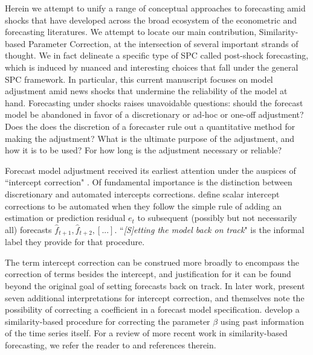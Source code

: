 \documentclass{uiucthesis2021}
\theoremstyle{definition}
\begin{document}
Herein we attempt to unify a range of conceptual approaches to forecasting amid shocks that have developed across the broad ecosystem of the econometric and forecasting literatures.  We attempt to locate our main contribution, Similarity-based Parameter Correction, at the intersection of several important strands of thought.  We in fact delineate a specific type of SPC called post-shock forecasting, which is induced by nuanced and interesting choices that fall under the general SPC framework.  In particular, this current manuscript focuses on model adjustment amid news shocks that undermine the reliability of the  model at hand.  Forecasting under shocks raises unavoidable questions: should the forecast model be abandoned in favor of a discretionary or ad-hoc or one-off adjustment?  Does the does the discretion of a forecaster rule out a quantitative method for making the adjustment?  What is the ultimate purpose of the adjustment, and how it is to be used?  For how long is the adjustment necessary or reliable?

Forecast model adjustment received its earliest attention under the auspices of ``intercept correction" \citep{hendry1994theory,clements1996intercept,clements1998forecasting, clements1999forecasting}.  Of fundamental importance is the distinction between discretionary and automated intercepts corrections. \cite{hendry1994theory} define scalar intercept corrections to be automated when they follow the simple rule of adding an estimation or prediction residual $e_{t}$ to subsequent (possibly but not necessarily all) forecasts $\hat f_{t+1},\hat f_{t+2},[...].$ ``\textit{[S]etting the model back on track}" is the informal label they provide for that procedure. 
 
The term intercept correction can be construed more broadly to encompass the correction of terms besides the intercept, and justification for it can be found beyond the original goal of setting forecasts back on track.  In later work, \cite{clements1999forecasting} present seven additional interpretations for intercept correction, and \cite{hendry1994theory, clements1999forecasting} themselves note the possibility of correcting a coefficient in a forecast model specification. \cite{guerron2017macroeconomic} develop a similarity-based procedure for correcting the parameter $\beta$ using past information of the time series itself.   For a review of more recent work in similarity-based forecasting, we refer the reader to \cite{lundquist2024volatility} and references therein.
\end{document}
